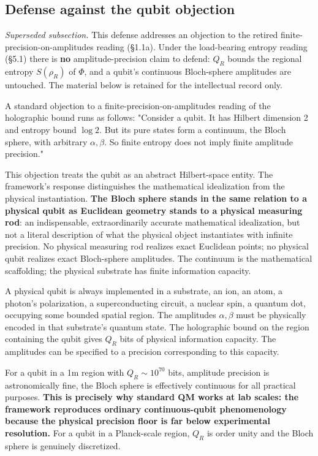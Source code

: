 \documentclass[11pt,a4paper]{article}
\begin{document}
\subsection{Defense against the qubit objection}

\emph{Superseded subsection.} This defense addresses an objection to the retired finite-precision-on-amplitudes reading (§1.1a). Under the load-bearing entropy reading (§5.1) there is \textbf{no} amplitude-precision claim to defend: $Q_R$ bounds the regional entropy $S(\rho_R)$ of $\Phi$, and a qubit's continuous Bloch-sphere amplitudes are untouched. The material below is retained for the intellectual record only.

A standard objection to a finite-precision-on-amplitudes reading of the holographic bound runs as follows: "Consider a qubit. It has Hilbert dimension 2 and entropy bound $\log 2$. But its pure states form a continuum, the Bloch sphere, with arbitrary $\alpha, \beta$. So finite entropy does not imply finite amplitude precision."

This objection treats the qubit as an abstract Hilbert-space entity. The framework's response distinguishes the mathematical idealization from the physical instantiation. \textbf{The Bloch sphere stands in the same relation to a physical qubit as Euclidean geometry stands to a physical measuring rod}: an indispensable, extraordinarily accurate mathematical idealization, but not a literal description of what the physical object instantiates with infinite precision. No physical measuring rod realizes exact Euclidean points; no physical qubit realizes exact Bloch-sphere amplitudes. The continuum is the mathematical scaffolding; the physical substrate has finite information capacity.

A physical qubit is always implemented in a substrate, an ion, an atom, a photon's polarization, a superconducting circuit, a nuclear spin, a quantum dot, occupying some bounded spatial region. The amplitudes $\alpha, \beta$ must be physically encoded in that substrate's quantum state. The holographic bound on the region containing the qubit gives $Q_R$ bits of physical information capacity. The amplitudes can be specified to a precision corresponding to this capacity.

For a qubit in a 1m region with $Q_R \sim 10^{70}$ bits, amplitude precision is astronomically fine, the Bloch sphere is effectively continuous for all practical purposes. \textbf{This is precisely why standard QM works at lab scales: the framework reproduces ordinary continuous-qubit phenomenology because the physical precision floor is far below experimental resolution.} For a qubit in a Planck-scale region, $Q_R$ is order unity and the Bloch sphere is genuinely discretized.
\end{document}
